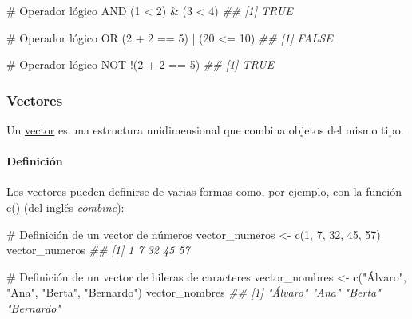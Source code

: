 \documentclass[
  letterpaper,
  DIV=11,
  numbers=noendperiod]{scrreprt}
\let\oldparagraph\paragraph
\renewcommand{\paragraph}[1]{\oldparagraph{#1}\mbox{}}
\newenvironment{Shaded}{\begin{snugshade}}{\end{snugshade}}
\newcommand{\CommentTok}[1]{\textcolor[rgb]{0.37,0.37,0.37}{#1}}
\newcommand{\DecValTok}[1]{\textcolor[rgb]{0.68,0.00,0.00}{#1}}
\newcommand{\DocumentationTok}[1]{\textcolor[rgb]{0.37,0.37,0.37}{\textit{#1}}}
\newcommand{\FunctionTok}[1]{\textcolor[rgb]{0.28,0.35,0.67}{#1}}
\newcommand{\NormalTok}[1]{\textcolor[rgb]{0.00,0.23,0.31}{#1}}
\newcommand{\OtherTok}[1]{\textcolor[rgb]{0.00,0.23,0.31}{#1}}
\newcommand{\SpecialCharTok}[1]{\textcolor[rgb]{0.37,0.37,0.37}{#1}}
\newcommand{\StringTok}[1]{\textcolor[rgb]{0.13,0.47,0.30}{#1}}
\begin{document}
\begin{Shaded}
\begin{Highlighting}[]
\CommentTok{\# Operador lógico AND}
\NormalTok{(}\DecValTok{1} \SpecialCharTok{\textless{}} \DecValTok{2}\NormalTok{) }\SpecialCharTok{\&}\NormalTok{ (}\DecValTok{3} \SpecialCharTok{\textless{}} \DecValTok{4}\NormalTok{)}
\DocumentationTok{\#\# [1] TRUE}

\CommentTok{\# Operador lógico OR}
\NormalTok{(}\DecValTok{2} \SpecialCharTok{+} \DecValTok{2} \SpecialCharTok{==} \DecValTok{5}\NormalTok{) }\SpecialCharTok{|}\NormalTok{ (}\DecValTok{20} \SpecialCharTok{\textless{}=} \DecValTok{10}\NormalTok{)}
\DocumentationTok{\#\# [1] FALSE}

\CommentTok{\# Operador lógico NOT}
\SpecialCharTok{!}\NormalTok{(}\DecValTok{2} \SpecialCharTok{+} \DecValTok{2} \SpecialCharTok{==} \DecValTok{5}\NormalTok{)}
\DocumentationTok{\#\# [1] TRUE}
\end{Highlighting}
\end{Shaded}

\hypertarget{vectores}{%
\subsubsection{Vectores}\label{vectores}}

Un
\href{https://cran.r-project.org/doc/manuals/r-release/R-lang.html\#Vector-objects}{vector}
es una estructura unidimensional que combina objetos del mismo tipo.

\hypertarget{definiciuxf3n}{%
\paragraph{Definición}\label{definiciuxf3n}}

Los vectores pueden definirse de varias formas como, por ejemplo, con la
función \href{https://rdrr.io/r/base/c.html}{c()} (del inglés
\emph{combine}):

\begin{Shaded}
\begin{Highlighting}[]
\CommentTok{\# Definición de un vector de números}
\NormalTok{vector\_numeros }\OtherTok{\textless{}{-}} \FunctionTok{c}\NormalTok{(}\DecValTok{1}\NormalTok{, }\DecValTok{7}\NormalTok{, }\DecValTok{32}\NormalTok{, }\DecValTok{45}\NormalTok{, }\DecValTok{57}\NormalTok{)}
\NormalTok{vector\_numeros}
\DocumentationTok{\#\# [1]  1  7 32 45 57}

\CommentTok{\# Definición de un vector de hileras de caracteres}
\NormalTok{vector\_nombres }\OtherTok{\textless{}{-}} \FunctionTok{c}\NormalTok{(}\StringTok{"Álvaro"}\NormalTok{, }\StringTok{"Ana"}\NormalTok{, }\StringTok{"Berta"}\NormalTok{, }\StringTok{"Bernardo"}\NormalTok{)}
\NormalTok{vector\_nombres}
\DocumentationTok{\#\# [1] "Álvaro"   "Ana"      "Berta"    "Bernardo"}
\end{Highlighting}
\end{Shaded}
\end{document}
